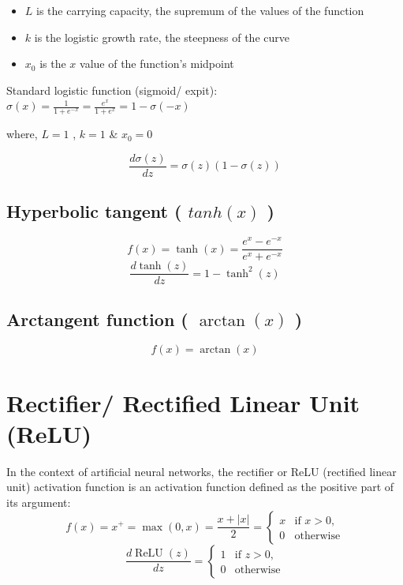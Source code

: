 \vspace{0.2cm}

\begin{itemize}
    \item $L$ is the carrying capacity, the supremum of the values of the function
    \item $k$ is the logistic growth rate, the steepness of the curve
    \item $x_{0}$ is the $x$ value of the function's midpoint
\end{itemize}

\vspace{0.2cm}
\noindent Standard logistic function (sigmoid/ expit):\label{sigmoid}
\(
\sigma(x) = {\displaystyle\frac{1}{1+e^{-x}}} = {\displaystyle\frac{e^{x}}{1+e^{x}}} = 1- \sigma(-x)
\)

where, $L=1$ , $k=1$ \& $x_{0}=0$


\[
    \displaystyle\frac{d\sigma(z)}{dz} = \sigma(z)(1 - \sigma(z))
\]


\subsection{Hyperbolic tangent ( $tanh(x)$ ) \cite{wiki-Sigmoid_function,wiki-Hyperbolic_functions}}\label{Hyperbolic tangent}

\[
    f(x)=\tanh(x)={\displaystyle\frac {e^{x}-e^{-x}}{e^{x}+e^{-x}}}
\]
\[
    \displaystyle\frac{d\tanh(z)}{dz} = 1-\tanh^2(z)
\]


\subsection{Arctangent function ( $\arctan(x)$ ) \cite{wiki-Inverse_trigonometric_functions}}
\[
    f(x)=\arctan(x)
\]


\section{Rectifier/ Rectified Linear Unit (ReLU) \cite{wiki-Rectifier}}\label{ReLU}
In the context of artificial neural networks, the rectifier or ReLU (rectified linear unit) activation function is an activation function defined as the positive part of its argument:
\[
    f(x)=x^{+}=\max(0,x)={\displaystyle\frac {x+|x|}{2}}={\begin{cases}x&{\text{if }}x>0,\\0&{\text{otherwise}}\end{cases}}
\]
\[
    \displaystyle\frac{d\operatorname{ReLU}(z)}{dz}={\begin{cases}1&{\text{if }}z>0,\\0&{\text{otherwise}}\end{cases}}
\]

